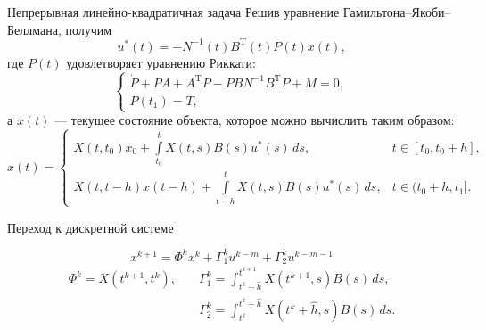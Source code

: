         \begin{frame}{Непрерывная линейно-квадратичная задача}
                Решив уравнение Гамильтона--Якоби--Беллмана, получим
                \begin{equation*}
                        u^*(t) = -N^{-1}(t)B^{\mathrm{T}}(t) P(t)x(t),
                \end{equation*}
                где $P(t)$ удовлетворяет уравнению Риккати:
                \begin{equation*}
                        \begin{cases}
                                \dot P + PA + A^{\mathrm{T}} P - PBN^{-1}B^{\mathrm{T}} P + M = 0,\\
                                P(t_1) = T,
                        \end{cases}
                \end{equation*}
                а $x(t)$ --- текущее состояние объекта, которое можно вычислить таким образом:
                \begin{equation*}
                        x(t) =
                        \begin{cases}
                                X(t,t_0)x_0 + \int\limits_{t_0}^{t}X(t,s)B(s)u^*(s)\,ds,
                                &
                                t \in [t_0,t_0 + h],
                                \\
                                X(t,t - h)x(t-h) + \int\limits_{t - h}^{t}X(t,s)B(s)u^*(s)\,ds,
                                &
                                t \in (t_0 + h,t_1].
                        \end{cases}
                \end{equation*}
        \end{frame}
        \begin{frame}[t]{Переход к дискретной системе}
                \centering
                
                \begin{equation*}
                        \boxed{
                                x^{k+1}
                                =
                                \Phi^k x^k + \Gamma_1^k u^{k-m} + \Gamma_2^k u^{k-m-1}
                        }
                \end{equation*}
                \begin{equation*}
                        \begin{aligned}
                                \Phi^k = X(t^{k+1},t^k), \quad
                                &\Gamma_1^k
                                =
                                \int_{t^{k} + \hat h}^{t^{k+1}} X(t^{k+1},s)B(s)\,ds,
                                \\
                                &\Gamma_2^k
                                =
                                \int_{t^k}^{t^{k} + \hat h} X(t^{k} + \hat h,s)B(s)\,ds.
                        \end{aligned}
                \end{equation*}
        \end{frame}

